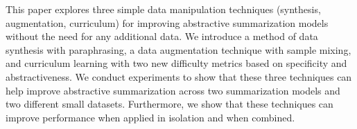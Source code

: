 This paper explores three simple data manipulation techniques (synthesis, augmentation, curriculum) for improving abstractive summarization models without the need for any additional data. We introduce a method of data synthesis with paraphrasing, a data augmentation technique with sample mixing, and curriculum learning with two new difficulty metrics based on specificity and abstractiveness. We conduct experiments to show that these three techniques can help improve abstractive summarization across two summarization models and two different small datasets. Furthermore, we show that these techniques can improve performance when applied in isolation and when combined.
